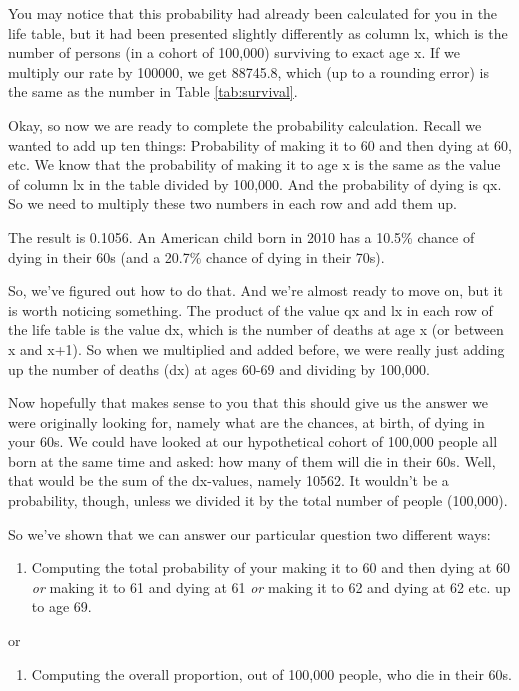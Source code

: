 \documentclass[openany]{book}
\providecommand{\tightlist}{%
  \setlength{\itemsep}{0pt}\setlength{\parskip}{0pt}}
\begin{document}
You may notice that this probability had already been calculated for you in the life table, but it had been presented slightly differently as column lx, which is the number of persons (in a cohort of 100,000) surviving to exact age x. If we multiply our rate by 100000, we get 88745.8, which (up to a rounding error) is the same as the number in Table \ref{tab:survival}.

Okay, so now we are ready to complete the probability calculation. Recall we wanted to add up ten things: Probability of making it to 60 and then dying at 60, etc. We know that the probability of making it to age x is the same as the value of column lx in the table divided by 100,000. And the probability of dying is qx. So we need to multiply these two numbers in each row and add them up.

The result is 0.1056. An American child born in 2010 has a 10.5\% chance of dying in their 60s (and a 20.7\% chance of dying in their 70s).

So, we've figured out how to do that. And we're almost ready to move on, but it is worth noticing something. The product of the value qx and lx in each row of the life table is the value dx, which is the number of deaths at age x (or between x and x+1). So when we multiplied and added before, we were really just adding up the number of deaths (dx) at ages 60-69 and dividing by 100,000.

Now hopefully that makes sense to you that this should give us the answer we were originally looking for, namely what are the chances, at birth, of dying in your 60s. We could have looked at our hypothetical cohort of 100,000 people all born at the same time and asked: how many of them will die in their 60s. Well, that would be the sum of the dx-values, namely 10562. It wouldn't be a probability, though, unless we divided it by the total number of people (100,000).

So we've shown that we can answer our particular question two different ways:

\begin{enumerate}
\def\labelenumi{\Alph{enumi})}
\tightlist
\item
  Computing the total probability of your making it to 60 and then dying at 60 \emph{or} making it to 61 and dying at 61 \emph{or} making it to 62 and dying at 62 etc. up to age 69.
\end{enumerate}

or

\begin{enumerate}
\def\labelenumi{\Alph{enumi})}
\setcounter{enumi}{1}
\tightlist
\item
  Computing the overall proportion, out of 100,000 people, who die in their 60s.
\end{enumerate}
\end{document}
